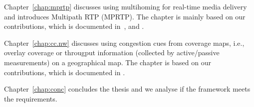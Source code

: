 
Chapter~\ref{chap:mprtp} discusses using multihoming for real-time media delivery
and introduces Multipath RTP (MPRTP). The chapter is mainly based on our
contributions, which is documented in~\cite{draft.mprtp, draft.mprtp.sdp,
Globisch:AsymGrpComm, draft.rtcp.overlay}, and .


Chapter~\ref{chap:cc.nw} discusses using congestion cues from coverage maps, i.e.,
overlay coverage or througput information (collected by active/passive
measurements) on a geographical map. The chapter is based on our
contributions,  which is documented in .


Chapter~\ref{chap:conc} concludes the thesis and we analyse if the framework meets
the requirements.
